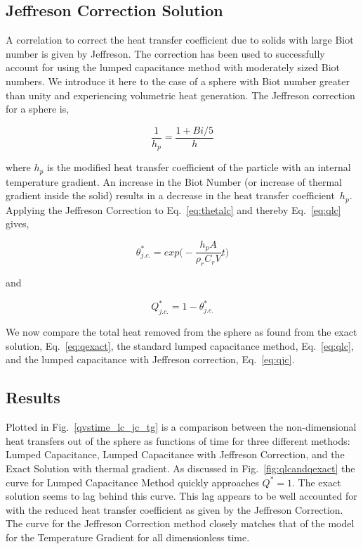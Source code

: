 
\subsection{Jeffreson Correction Solution}
A correlation to correct the heat transfer coefficient due to solids with large Biot number is given by Jeffreson\cite{jeffreson409}. The correction has been used to successfully account for using the lumped capacitance method with moderately sized Biot numbers. We introduce it here to the case of a sphere with Biot number greater than unity and experiencing volumetric heat generation. The Jeffreson correction for a sphere is,

\begin{equation}
	\frac{1}{h_{p}}=\frac{1+Bi/5}{h}
\end{equation}

where $h_p$ is the modified heat transfer coefficient of the particle with an internal temperature gradient.  An increase in the Biot Number (or increase of thermal gradient inside the solid) results in a decrease in the heat transfer coefficient~$h_p$.  Applying the Jeffreson Correction to Eq.~\ref{eq:thetalc} and thereby Eq.~\ref{eq:qlc} gives,

\begin{equation}
	\theta^*_{j.c.}=exp\bigg(-\frac{h_{p}A}{\rho_r C_rV}t\bigg)
\end{equation}

and

\begin{equation}
\label{eq:qjc}
	Q^*_{j.c.}=1-\theta^*_{j.c.}
\end{equation}

We now compare the total heat removed from the sphere as found from the exact solution, Eq.~\ref{eq:qexact}, the standard lumped capacitance method, Eq.~\ref{eq:qlc}, and the lumped capacitance with Jeffreson correction, Eq.~\ref{eq:qjc}.

\subsection{Results}
Plotted in Fig.~\ref{qvstime_lc_jc_tg} is a comparison between the non-dimensional heat transfers out of the sphere as functions of time for three different methods: Lumped Capacitance, Lumped Capacitance with Jeffreson Correction, and the Exact Solution with thermal gradient. As discussed in Fig.~\ref{fig:qlcandqexact}  the curve for Lumped Capacitance Method quickly approaches $Q^*=1$. The exact solution seems to lag behind this curve. This lag appears to be well accounted for with the reduced heat transfer coefficient as given by the Jeffreson Correction.  The curve for the Jeffreson Correction method closely matches that of the model for the Temperature Gradient for all dimensionless time.  

